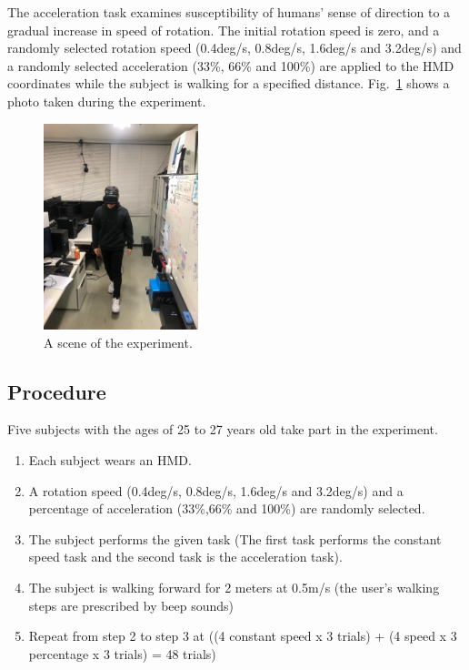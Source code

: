 The acceleration task examines susceptibility of humans' sense of direction to a gradual increase in speed of rotation.
The initial rotation speed is zero, and a randomly selected rotation speed (0.4deg/s, 0.8deg/s, 1.6deg/s and 3.2deg/s) and a randomly selected acceleration (33\%, 66\% and 100\%) are applied to the HMD coordinates while the subject is walking for a specified distance. Fig.~\ref{fig:Equipment 2} shows a photo taken during the experiment. 
\begin{figure}[H]\centering
	\includegraphics[width=0.4\textwidth]{Pictures/Equipment 2.png}%
	\caption{A scene of the experiment.}\label{fig:Equipment 2}%
\end{figure}
\newpage

\subsection{Procedure} 
Five subjects with the ages of 25 to 27 years old take part in the experiment.
\begin{enumerate}
	\item Each subject wears an HMD.
	\item A rotation speed (0.4deg/s, 0.8deg/s, 1.6deg/s and 3.2deg/s) and a percentage of acceleration (33\%,66\% and 100\%) are randomly selected. 
	\item The subject performs the given task (The first task performs the constant speed
	task and the second task is the acceleration task).
	\item The subject is walking forward for 2 meters at 0.5m/s (the user's walking steps are prescribed by beep sounds)
	\item Repeat from step 2 to step 3 at ((4 constant speed x 3 trials) + (4 speed x 3 percentage x 3 trials) = 48 trials)
\end{enumerate}


